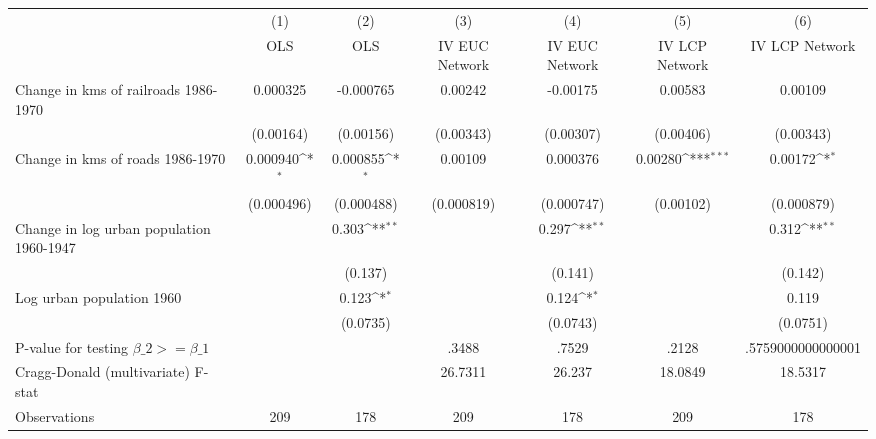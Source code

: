 {
\def\sym#1{\ifmmode^{#1}\else\(^{#1}\)\fi}
\begin{tabular}{l*{6}{c}}
\hline\hline
                &\multicolumn{1}{c}{(1)}&\multicolumn{1}{c}{(2)}&\multicolumn{1}{c}{(3)}&\multicolumn{1}{c}{(4)}&\multicolumn{1}{c}{(5)}&\multicolumn{1}{c}{(6)}\\
                &\multicolumn{1}{c}{OLS}&\multicolumn{1}{c}{OLS}&\multicolumn{1}{c}{IV EUC Network}&\multicolumn{1}{c}{IV EUC Network}&\multicolumn{1}{c}{IV LCP Network}&\multicolumn{1}{c}{IV LCP Network}\\
\hline
Change in kms of railroads 1986-1970& 0.000325         &-0.000765         &  0.00242         & -0.00175         &  0.00583         &  0.00109         \\
                &(0.00164)         &(0.00156)         &(0.00343)         &(0.00307)         &(0.00406)         &(0.00343)         \\
[1em]
Change in kms of roads 1986-1970& 0.000940\sym{*}  & 0.000855\sym{*}  &  0.00109         & 0.000376         &  0.00280\sym{***}&  0.00172\sym{*}  \\
                &(0.000496)         &(0.000488)         &(0.000819)         &(0.000747)         &(0.00102)         &(0.000879)         \\
[1em]
Change in log urban population 1960-1947&                  &    0.303\sym{**} &                  &    0.297\sym{**} &                  &    0.312\sym{**} \\
                &                  &  (0.137)         &                  &  (0.141)         &                  &  (0.142)         \\
[1em]
Log urban population 1960&                  &    0.123\sym{*}  &                  &    0.124\sym{*}  &                  &    0.119         \\
                &                  & (0.0735)         &                  & (0.0743)         &                  & (0.0751)         \\
\hline
P-value for testing $\beta\_{2} >= \beta\_{1}$&                  &                  &    .3488         &    .7529         &    .2128         &.5759000000000001         \\
Cragg-Donald (multivariate) F-stat&                  &                  &  26.7311         &   26.237         &  18.0849         &  18.5317         \\
Observations    &      209         &      178         &      209         &      178         &      209         &      178         \\
\hline\hline
\end{tabular}
}
